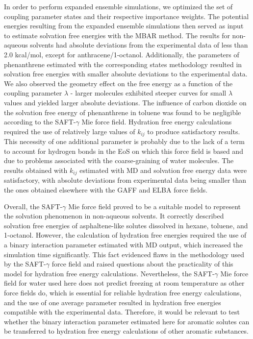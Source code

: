 \documentclass[preprint]{elsarticle}
\begin{document}
	In order to perform expanded ensemble simulations, we optimized the set of coupling parameter states and their respective importance weights. The potential energies resulting from the expanded ensemble simulations then served as input to estimate solvation free energies with the MBAR method. The results for non-aqueous solvents had absolute deviations from the experimental data of less than 2.0 kcal/mol, except for anthracene/1-octanol. Additionally, the parameters of phenanthrene estimated with the corresponding states methodology resulted in solvation free energies with smaller absolute deviations to the experimental data. We also observed the geometry effect on the free energy as a function of the coupling parameter $\lambda$ - larger molecules exhibited steeper curves for small $\lambda$ values and yielded larger absolute deviations. The influence of carbon dioxide on the solvation free energy of phenanthrene in toluene was found to be negligible according to the SAFT-$\gamma$ Mie force field. Hydration free energy calculations required the use of relatively large values of $k_{ij}$ to produce satisfactory results.
	This necessity of one additional parameter is probably due to the lack of a term to account for hydrogen bonds in the EoS on which this force field is based and due to problems associated with the coarse-graining of water molecules. The results obtained with $k_{ij}$ estimated with MD and solvation free energy data were satisfactory, with absolute deviations from experimental data being smaller than the ones obtained elsewhere with the GAFF and ELBA force fields.

	Overall, the SAFT-$\gamma$ Mie force field proved to be a suitable model to represent the solvation phenomenon in non-aqueous solvents. It correctly described solvation free energies of asphaltene-like solutes dissolved in hexane, toluene, and 1-octanol. However, the calculation of hydration free energies required the use of a binary interaction parameter estimated with MD output, which increased the simulation time significantly. This fact evidenced flaws in the methodology used by the SAFT-$\gamma$ force field and raised questions about the practicality of this model for hydration free energy calculations. Nevertheless, the SAFT-$\gamma$ Mie force field for water used here does not predict freezing at room temperature as other force fields do, which is essential for reliable hydration free energy calculations, and the use of one average parameter resulted in hydration free energies compatible with the experimental data.
	Therefore, it would be relevant to test whether the binary interaction parameter estimated here for aromatic solutes can be transferred to hydration free energy calculations of other aromatic substances.
\end{document}
